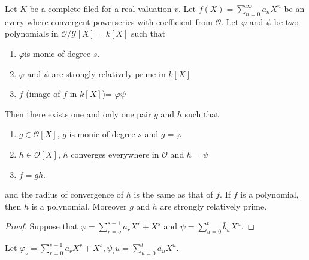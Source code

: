 \begin{corollary}\label{part1:chap2:sec1:coro1}%
  Let $K$ be a complete filed for a real valuation $v$. Let $f(X) =
  \sum\limits_{n=0}^{\infty} a_n X^n$ be an every-where convergent
  powerseries with coefficient from $\mathscr{O}$. Let $\varphi$ and $
  \psi$ be two polynomials in $\mathscr{O}/ \mathscr{Y}[X]= k[X]$ such
  that 
  \begin{enumerate}[\rm(1)]
  \item $\varphi$\pageoriginale is monic of degree $s$.
  \item $\varphi$ and $\psi$ are strongly relatively prime in $k[X]$
  \item $\bar{f}$ (image of $f$ in $k[X]$)= $\varphi \psi$
  \end{enumerate}

  Then there exists one and only one pair $g$ and $h$ such that
  \begin{enumerate}[\rm(1)]
  \item $g \in \mathscr{O}[X]$, $g$ is monic of degree $s$ and
    $\bar{g}= \varphi$ 
  \item $h \in \mathscr{O}[X]$, $h$ converges everywhere in
    $\mathscr{O}$ and $\bar{h}= \psi$ 
  \item $f = g h $.
  \end{enumerate}
  and the radius of convergence of $h$ is the same as that of $f$. If
  $f$ is a polynomial, then $h$ is a polynomial. Moreover $g$ and $h$
  are strongly relatively prime. 
\end{corollary}

\begin{proof}%
  Suppose that $\varphi= \sum\limits_{r= o}^{s-1} \bar{a}_r X^r + X^s$
  and $\psi= \sum\limits_{u= 0}^{t} \bar{b}_u X^u$. 
\end{proof}

Let $\varphi_\circ= \sum\limits_{r=0}^{s-1} a_r X^r + X^s,
\psi_{\circ} u= \sum\limits_{u=0}^{t}\bar{a}_u X^u$. 

